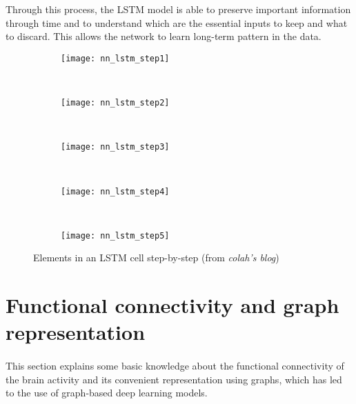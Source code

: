 Through this process, the LSTM model is able to preserve important information through time and to understand which are the essential inputs to keep and what to discard. This allows the network to learn long-term pattern in the data.
\newpage
\begin{figure}[H]
    \centering
    \begin{subfigure}[t]{0.7\textwidth}
		\texttt{[image: nn\_lstm\_step1]}
        \caption{}
        \label{fig:nn_lstm_step1}
	\end{subfigure}
	~
	\begin{subfigure}[t]{0.7\textwidth}
		\texttt{[image: nn\_lstm\_step2]}
        \caption{}
        \label{fig:nn_lstm_step2}
    \end{subfigure}
    ~
    \begin{subfigure}[t]{0.7\textwidth}
		\texttt{[image: nn\_lstm\_step3]}
        \caption{}
        \label{fig:nn_lstm_step3}
    \end{subfigure}
    ~
    \begin{subfigure}[t]{0.7\textwidth}
		\texttt{[image: nn\_lstm\_step4]}
        \caption{}
        \label{fig:nn_lstm_step4}
    \end{subfigure}
    ~
    \begin{subfigure}[t]{0.7\textwidth}
		\texttt{[image: nn\_lstm\_step5]}
        \caption{}
        \label{fig:nn_lstm_step5}
    \end{subfigure}
    \caption{Elements in an LSTM cell step-by-step (from \textit{colah's blog})}
    \label{fig:lstm_steps}
\end{figure}
\newpage


\section{Functional connectivity and graph representation} \label{sec: fc_graphs}
\paragraph{} This section explains some basic knowledge about the functional connectivity of the brain activity and its convenient representation using graphs, which has led to the use of graph-based deep learning models.


